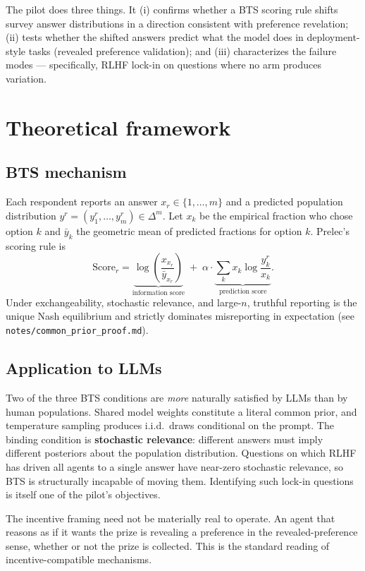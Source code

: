 \documentclass[11pt]{article}
\begin{document}
The pilot does three things. It (i) confirms whether a BTS scoring rule
shifts survey answer distributions in a direction consistent with preference
revelation; (ii) tests whether the shifted answers predict what the model
does in deployment-style tasks (revealed preference validation); and (iii)
characterizes the failure modes — specifically, RLHF lock-in on questions
where no arm produces variation.

\section{Theoretical framework}

\subsection{BTS mechanism}

Each respondent reports an answer $x_r \in \{1,\ldots,m\}$ and a predicted
population distribution $y^r = (y_1^r,\ldots,y_m^r) \in \Delta^m$. Let
$x_k$ be the empirical fraction who chose option $k$ and $\bar y_k$ the
geometric mean of predicted fractions for option $k$. Prelec's scoring rule
is
\[
\text{Score}_r = \underbrace{\log\left(\frac{x_{x_r}}{\bar y_{x_r}}\right)}_{\text{information score}}
\;+\; \alpha \cdot \underbrace{\sum_k x_k \log\frac{y_k^r}{x_k}}_{\text{prediction score}}.
\]
Under exchangeability, stochastic relevance, and large-$n$, truthful
reporting is the unique Nash equilibrium and strictly dominates
misreporting in expectation (see \texttt{notes/common\_prior\_proof.md}).

\subsection{Application to LLMs}

Two of the three BTS conditions are \emph{more} naturally satisfied by LLMs
than by human populations. Shared model weights constitute a literal common
prior, and temperature sampling produces i.i.d.\ draws conditional on the
prompt. The binding condition is \textbf{stochastic relevance}: different
answers must imply different posteriors about the population distribution.
Questions on which RLHF has driven all agents to a single answer have
near-zero stochastic relevance, so BTS is structurally incapable of moving
them. Identifying such lock-in questions is itself one of the pilot's
objectives.

The incentive framing need not be materially real to operate. An agent that
reasons as if it wants the prize is revealing a preference in the
revealed-preference sense, whether or not the prize is collected. This is
the standard reading of incentive-compatible mechanisms.
\end{document}
